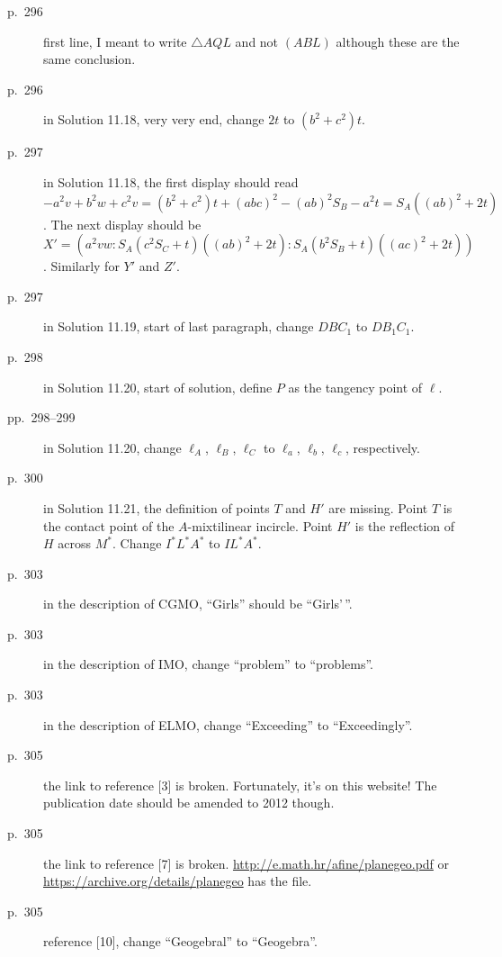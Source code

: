 \documentclass[11pt]{scrartcl}
\begin{document}
\begin{description}
\item[p.\  296] first line, I meant to write $\triangle{AQL}$ and not $(ABL)$
  although these are the same conclusion.
\item[p.\  296] in Solution 11.18, very very end, change $2t$ to $(b^2+c^2)t$.
\item[p.\  297] in Solution 11.18, the first display should read
  $-a^2v + b^2w + c^2v = (b^2+c^2)t + (abc)^2 - (ab)^2S_B - a^2t = S_A ((ab)^2 + 2t)$.
  The next display should be
  $X' = \left( a^2vw : S_A(c^2S_C+t)((ab)^2+2t) : S_A(b^2S_B+t)((ac)^2+2t) \right)$.
  Similarly for $Y'$ and $Z'$.
\item[p.\  297] in Solution 11.19, start of last paragraph, change $DBC_1$ to $DB_1C_1$.
\item[p.\  298] in Solution 11.20, start of solution, define $P$ as the tangency point of $\ell$.
\item[pp.\  298--299] in Solution 11.20, change $\ell_A$, $\ell_B$, $\ell_C$
  to $\ell_a$, $\ell_b$, $\ell_c$, respectively.
\item[p.\  300] in Solution 11.21, the definition of points $T$ and $H'$ are missing.
  Point $T$ is the contact point of the $A$-mixtilinear incircle.
  Point $H'$ is the reflection of $H$ across $M^\ast$.
  Change $I^\ast L^\ast A^\ast$ to $IL^\ast A^\ast$.
\item[p.\  303] in the description of CGMO, ``Girls'' should be ``Girls'\,''.
\item[p.\  303] in the description of IMO, change ``problem'' to ``problems''.
\item[p.\  303] in the description of ELMO, change ``Exceeding'' to ``Exceedingly''.
\item[p.\  305] the link to reference [3] is broken. Fortunately, it's on this website!
  The publication date should be amended to 2012 though.
\item[p.\  305] the link to reference [7] is broken. \url{http://e.math.hr/afine/planegeo.pdf}
  or \url{https://archive.org/details/planegeo} has the file.
\item[p.\  305] reference [10], change ``Geogebral'' to ``Geogebra''.
\end{description}
\end{document}
